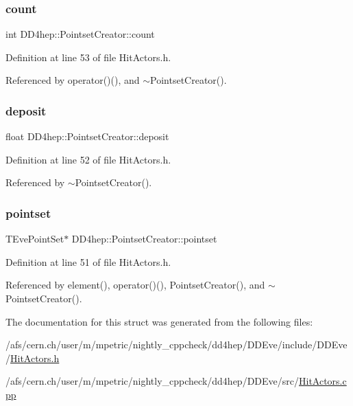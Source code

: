 \subsubsection{\texorpdfstring{count}{count}}
{\footnotesize\ttfamily int D\+D4hep\+::\+Pointset\+Creator\+::count}



Definition at line 53 of file Hit\+Actors.\+h.



Referenced by operator()(), and $\sim$\+Pointset\+Creator().

\hypertarget{struct_d_d4hep_1_1_pointset_creator_a6caa5f448ed788b5ff8bcac223b6e5a8}{}\label{struct_d_d4hep_1_1_pointset_creator_a6caa5f448ed788b5ff8bcac223b6e5a8} 
\subsubsection{\texorpdfstring{deposit}{deposit}}
{\footnotesize\ttfamily float D\+D4hep\+::\+Pointset\+Creator\+::deposit}



Definition at line 52 of file Hit\+Actors.\+h.



Referenced by $\sim$\+Pointset\+Creator().

\hypertarget{struct_d_d4hep_1_1_pointset_creator_a59f3e1be9bcdc98a6d94a0c1dbee10bd}{}\label{struct_d_d4hep_1_1_pointset_creator_a59f3e1be9bcdc98a6d94a0c1dbee10bd} 
\subsubsection{\texorpdfstring{pointset}{pointset}}
{\footnotesize\ttfamily T\+Eve\+Point\+Set$\ast$ D\+D4hep\+::\+Pointset\+Creator\+::pointset}



Definition at line 51 of file Hit\+Actors.\+h.



Referenced by element(), operator()(), Pointset\+Creator(), and $\sim$\+Pointset\+Creator().



The documentation for this struct was generated from the following files\+:\begin{DoxyCompactItemize}
\item 
/afs/cern.\+ch/user/m/mpetric/nightly\+\_\+cppcheck/dd4hep/\+D\+D\+Eve/include/\+D\+D\+Eve/\hyperlink{_hit_actors_8h}{Hit\+Actors.\+h}\item 
/afs/cern.\+ch/user/m/mpetric/nightly\+\_\+cppcheck/dd4hep/\+D\+D\+Eve/src/\hyperlink{_hit_actors_8cpp}{Hit\+Actors.\+cpp}\end{DoxyCompactItemize}
